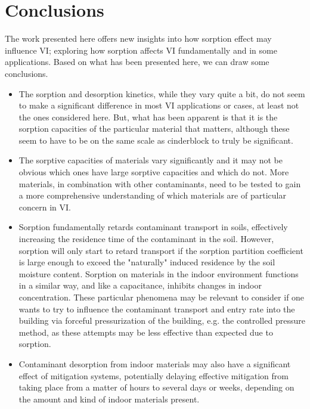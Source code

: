 \section{Conclusions}\label{sec:conclusions}

The work presented here offers new insights into how sorption effect may influence VI; exploring how sorption affects VI fundamentally and in some applications.
Based on what has been presented here, we can draw some conclusions.
\begin{itemize}
  \item The sorption and desorption kinetics, while they vary quite a bit, do not seem to make a significant difference in most VI applications or cases, at least not the ones considered here. But, what has been apparent is that it is the sorption capacities of the particular material that matters, although these seem to have to be on the same scale as cinderblock to truly be significant.
  \item The sorptive capacities of materials vary significantly and it may not be obvious which ones have large sorptive capacities and which do not. More materials, in combination with other contaminants, need to be tested to gain a more comprehensive understanding of which materials are of particular concern in VI.
  \item Sorption fundamentally retards contaminant transport in soils, effectively increasing the residence time of the contaminant in the soil. However, sorption will only start to retard transport if the sorption partition coefficient is large enough to exceed the "naturally" induced residence by the soil moisture content. Sorption on materials in the indoor environment functions in a similar way, and like a capacitance, inhibits changes in indoor concentration. These particular phenomena may be relevant to consider if one wants to try to influence the contaminant transport and entry rate into the building via forceful pressurization of the building, e.g. the controlled pressure method, as these attempts may be less effective than expected due to sorption.
  \item Contaminant desorption from indoor materials may also have a significant effect of mitigation systems, potentially delaying effective mitigation from taking place from a matter of hours to several days or weeks, depending on the amount and kind of indoor materials present.
\end{itemize}
